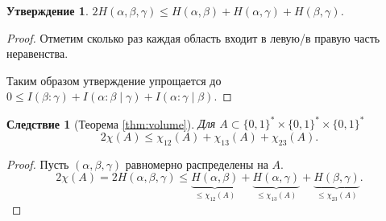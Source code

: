 \documentclass[12pt]{article}
\newcommand{\binstr}{\{0,1\}^*}
\theoremstyle{definition}
\theoremstyle{plain}
\newtheorem{statement}{Утверждение}[section]
\newtheorem{corollary}{Следствие}[section]
\theoremstyle{remark}
\begin{document}
\begin{statement}
    \(2H(\alpha,\beta,\gamma)\le H(\alpha,\beta) + H(\alpha,\gamma) + H(\beta,\gamma)\).
\end{statement}
\begin{proof}
    Отметим сколько раз каждая область входит в левую/в правую часть неравенства.
    \begin{center}
    \end{center}
Таким образом утверждение упрощается до $0\le I(\beta:\gamma) + I(\alpha:\beta\mid\gamma) +
I(\alpha:\gamma\mid\beta).$
\end{proof}
\begin{corollary}[Теорема \ref{thm:volume}]
Для \(A\subset\binstr\times\binstr\times\binstr\)
\[2\chi(A) \le \chi_{12}(A) + \chi_{13}(A) + \chi_{23}(A).\]
\end{corollary}
\begin{proof}
    Пусть $(\alpha,\beta,\gamma)$ равномерно распределены на $A$.
    \[
        2\chi(A) = 2H(\alpha,\beta,\gamma)\le 
        \underbrace{H(\alpha,\beta) }_{\le\chi_{12}(A)} + 
        \underbrace{H(\alpha,\gamma)}_{\le\chi_{13}(A)} + 
        \underbrace{H(\beta,\gamma) }_{\le\chi_{23}(A)}.
    \]
\end{proof}
\end{document}
